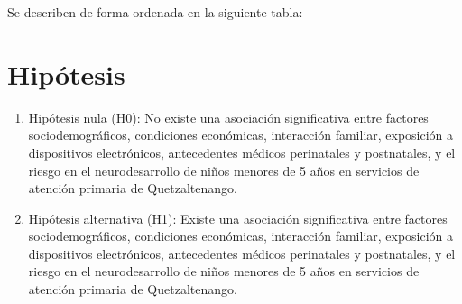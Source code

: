 \documentclass[11pt,letterpaper]{report}
\begin{document}
Se describen de forma ordenada en la siguiente tabla:



\section{Hipótesis}
	\begin{enumerate}
		\item Hipótesis nula (H0): No existe una asociación significativa entre
		factores sociodemográficos, condiciones económicas, interacción
		familiar, exposición a dispositivos electrónicos, antecedentes médicos
		perinatales y postnatales, y el riesgo en el neurodesarrollo de niños
		menores de 5 años en servicios de atención primaria de Quetzaltenango.
		\item Hipótesis alternativa (H1): Existe una asociación significativa
		entre factores sociodemográficos, condiciones económicas, interacción
		familiar, exposición a dispositivos electrónicos, antecedentes médicos
		perinatales y postnatales, y el riesgo en el neurodesarrollo de niños
		menores de 5 años en servicios de atención primaria de Quetzaltenango.
	\end{enumerate}
\end{document}
